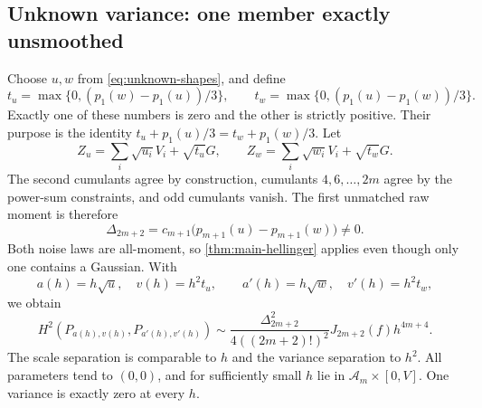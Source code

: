 \documentclass[11pt,a4paper]{article}
\numberwithin{equation}{section}
\theoremstyle{definition}
\theoremstyle{remark}
\newcommand{\cA}{\mathcal A}
\begin{document}
\subsection{Unknown variance: one member exactly unsmoothed}
Choose $u,w$ from \eqref{eq:unknown-shapes}, and define
\begin{equation}
 t_u=\max\{0,(p_1(w)-p_1(u))/3\},\qquad
 t_w=\max\{0,(p_1(u)-p_1(w))/3\}.
 \label{eq:compensation}
\end{equation}
Exactly one of these numbers is zero and the other is strictly positive.
Their purpose is the identity
$t_u+p_1(u)/3=t_w+p_1(w)/3$. Let
\[
 Z_u=\sum_i\sqrt{u_i}V_i+\sqrt{t_u}G,
 \qquad Z_w=\sum_i\sqrt{w_i}V_i+\sqrt{t_w}G.
\]
The second cumulants agree by construction, cumulants $4,6,\ldots,2m$
agree by the power-sum constraints, and odd cumulants vanish. The first
unmatched raw moment is therefore
\begin{equation}
 \Delta_{2m+2}=c_{m+1}\bigl(p_{m+1}(u)-p_{m+1}(w)\bigr)\ne0.
 \label{eq:delta-unknown}
\end{equation}
Both noise laws are all-moment, so \cref{thm:main-hellinger} applies even
though only one contains a Gaussian. With
\[
 a(h)=h\sqrt u,\quad v(h)=h^2t_u,\qquad
 a'(h)=h\sqrt w,\quad v'(h)=h^2t_w,
\]
we obtain
\begin{equation}
 H^2(P_{a(h),v(h)},P_{a'(h),v'(h)})
 \sim\frac{\Delta_{2m+2}^2}{4((2m+2)!)^2}
 J_{2m+2}(f)h^{4m+4}.
 \label{eq:H-unknown}
\end{equation}
The scale separation is comparable to $h$ and the variance separation to
$h^2$. All parameters tend to $(0,0)$, and for sufficiently small $h$ lie
in $\cA_m\times[0,V]$. One variance is exactly zero at every $h$.
\end{document}
